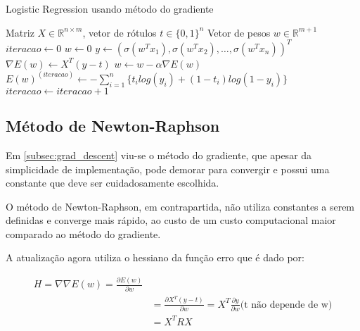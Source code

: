 \begin{algorithm}[H]
	\caption{Logistic Regression usando método do gradiente}
	\begin{algorithmic}[1]
		\REQUIRE Matriz $ X \in \mathbb{R}^{n \times m} $, 
		vetor de rótulos $t \in \{0, 1\}^n$
		\ENSURE Vetor de pesos $w \in \mathbb{R}^{m + 1}$
		\STATE $iteracao \leftarrow 0$
		\STATE $w \leftarrow 0$
			\STATE $y \leftarrow (\sigma(w^Tx_1), \sigma(w^Tx_2), \ldots, \sigma(w^Tx_n))^T$ 
			\STATE $\nabla E(w) \leftarrow X^T(y - t)$ 
			\STATE $w \leftarrow w - \alpha \nabla E(w)$ 
			\STATE $E(w)^{ (iteracao) } \leftarrow 
			- \sum_{i = 1}^{n} \{ t_ilog(y_i) + (1 - t_i) log(1 - y_i) \}$ 
			\STATE $iteracao \leftarrow iteracao + 1$
		\ENDWHILE
	\end{algorithmic}
\end{algorithm}

\subsection{Método de Newton-Raphson}
\label{subsec:newton-raphson}

Em \ref{subsec:grad_descent} viu-se o método do gradiente, que apesar da simplicidade de implementação,
pode demorar para convergir e possui uma constante que deve ser cuidadosamente escolhida.

O método de Newton-Raphson, em contrapartida, não utiliza constantes a serem definidas e
converge mais rápido, ao custo de um custo computacional maior comparado ao método do gradiente.

A atualização agora utiliza o hessiano da função erro que é dado por:

\begin{center}
	\begin{equation}
		\begin{split}
			\label{eq:hessian_error}
			H = \nabla \nabla E(w) = \frac{\partial E(w)}{\partial w} \\
			& = \frac{\partial X^T(y - t)}{\partial w} =  X^T \frac{\partial y}{\partial w} \text{(t não depende de w)} \\
			& = X^TRX
		\end{split}
	\end{equation}
\end{center}


